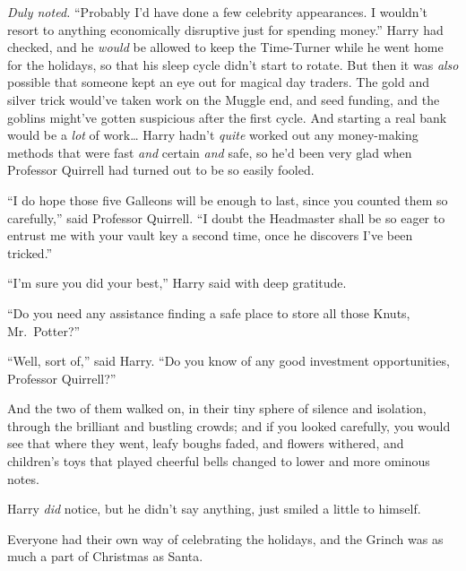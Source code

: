 \emph{Duly noted.} ``Probably I'd have done a few celebrity appearances.
I wouldn't resort to anything economically disruptive just for spending
money.'' Harry had checked, and he \emph{would} be allowed to keep the
Time-Turner while he went home for the holidays, so that his sleep cycle
didn't start to rotate. But then it was \emph{also} possible that
someone kept an eye out for magical day traders. The gold and silver
trick would've taken work on the Muggle end, and seed funding, and the
goblins might've gotten suspicious after the first cycle. And starting a
real bank would be a \emph{lot} of work\ldots{} Harry hadn't
\emph{quite} worked out any money-making methods that were fast
\emph{and} certain \emph{and} safe, so he'd been very glad when
Professor Quirrell had turned out to be so easily fooled.

``I do hope those five Galleons will be enough to last, since you
counted them so carefully,'' said Professor Quirrell. ``I doubt the
Headmaster shall be so eager to entrust me with your vault key a second
time, once he discovers I've been tricked.''

``I'm sure you did your best,'' Harry said with deep gratitude.

``Do you need any assistance finding a safe place to store all those
Knuts, Mr.~Potter?''

``Well, sort of,'' said Harry. ``Do you know of any good investment
opportunities, Professor Quirrell?''

And the two of them walked on, in their tiny sphere of silence and
isolation, through the brilliant and bustling crowds; and if you looked
carefully, you would see that where they went, leafy boughs faded, and
flowers withered, and children's toys that played cheerful bells changed
to lower and more ominous notes.

Harry \emph{did} notice, but he didn't say anything, just smiled a
little to himself.

Everyone had their own way of celebrating the holidays, and the Grinch
was as much a part of Christmas as Santa.
